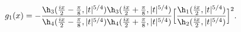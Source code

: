 \begin{equation}\label{e:g11}
g_1(x) = -\frac{
\h_3({ix\over 2}-{\pi\over 8},|t|^{5/4})
\h_3({ix\over 2}+{\pi\over 8},|t|^{5/4})}
{\h_4({ix\over 2}-{\pi\over 8},|t|^{5/4})
\h_4({ix\over 2}+{\pi\over 8},|t|^{5/4})}
\Bigl[\frac{\h_1({ix\over 2},|t|^{5/4})}
{\h_2({ix\over 2},|t|^{5/4})}\Bigr]^2.
\end{equation}

